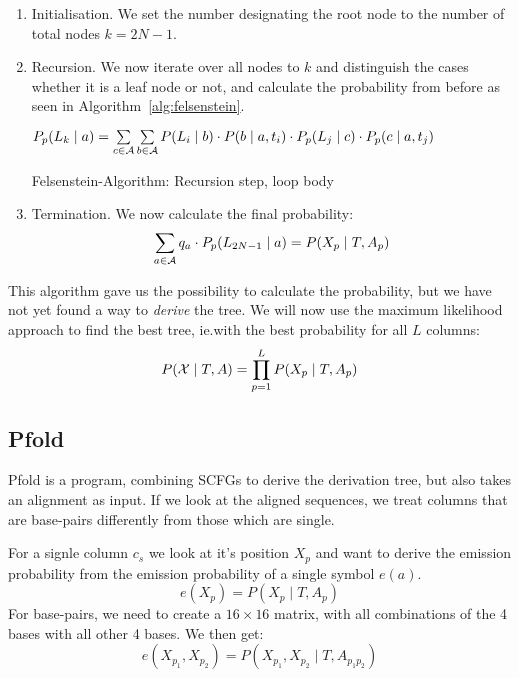 \begin{enumerate}[label=(\alph*)]
\item Initialisation.  We set the number designating the root node to the number
  of total nodes \(k = 2N-1\).
\item Recursion.  We now iterate over all nodes to \(k\) and distinguish
  the cases whether it is a leaf node or not, and calculate the probability
  from before as seen in Algorithm~\ref{alg:felsenstein}.


\AlgoDisplayBlockMarkers\SetAlgoNoLine%
\begin{algorithm}[ht]
 {
    $P_p(L_k \mid a) = \sum\limits_{c\in\mathcal{A}} \sum\limits_{b\in\mathcal{A}}
        P(L_i \mid b) \cdot P(b \mid a, t_i) \cdot P_p(L_j \mid c) \cdot P_p(c \mid a, t_j)$ \;
} 
\label{alg:felsenstein}
\caption{Felsenstein-Algorithm: Recursion step, loop body}
\end{algorithm}

\item Termination.  We now calculate the final probability:
  \[
    \sum_{a\in\mathcal{A}} q_a \cdot P_p(L_{2N-1} \mid a) = P(X_p \mid T, A_p)
  \]
\end{enumerate}
This algorithm gave us the possibility to calculate the probability, but we
have not yet found a way to \emph{derive} the tree.  We will now use the
maximum likelihood approach to find the best tree, ie.\@ with the best
probability for all \(L\) columns:
\[
  P(\mathcal{X} \mid T,A) = \prod_{p=1}^L P(X_p \mid T,A_p)
\]

\subsection{Pfold}

Pfold is a program, combining SCFGs to derive the derivation tree, but also
takes an alignment as input.  If we look at the aligned sequences, we treat
columns that are base-pairs differently from those which are single.

For a signle column \(c_s\) we look at it's position \(X_p\) and want to derive
the emission probability from the emission probability of a single symbol
\(e(a)\).
\[
  e(X_p) = P(X_p \mid T, A_p)
\]
For base-pairs, we need to create a \(16\times 16\) matrix, with
all combinations of the 4 bases with all other 4 bases.  We then get:
\[
  e(X_{p_1}, X_{p_2}) = P(X_{p_1}, X_{p_2} \mid T, A_{p_1 p_2})
\]

